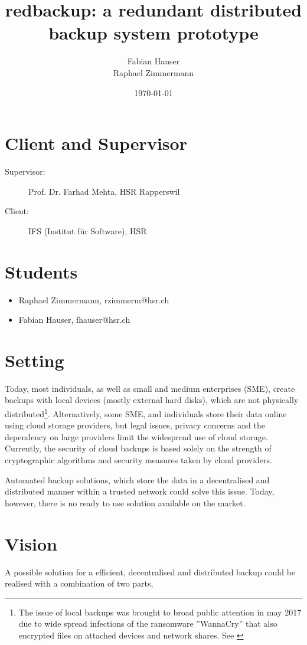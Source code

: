 \documentclass[a4paper]{article}
\title{redbackup: a redundant distributed backup system prototype}
\author{
		Fabian Hauser \\
		Raphael Zimmermann
}
\date{\today}
\begin{document}
\maketitle

\section{Client and Supervisor}
\begin{description}
	\item [Supervisor:] Prof. Dr. Farhad Mehta, HSR Rapperswil
	\item [Client:] IFS (Institut für Software), HSR
\end{description}


\section{Students}
\begin{itemize}
	\item Raphael Zimmermann, rzimmerm@hsr.ch
	\item Fabian Hauser, fhauser@hsr.ch
\end{itemize}

\section{Setting}

Today, most individuals, as well as small and medium enterprises (SME), create backups with local devices (mostly external hard disks), which are not physically distributed\footnote{The issue of local backups was brought to broad public attention in may 2017 due to wide spread infections of the ransomware ''WannaCry'' that also encrypted files on attached devices and network shares. See \cite{guardian_randsomware,nyt_randsomware}}. Alternatively, some SME, and individuals store their data online using cloud storage providers, but legal issues, privacy concerns and the dependency on large providers limit the widespread use of cloud storage. Currently, the security of cloud backups is based solely on the strength of cryptographic algorithms and security measures taken by cloud providers.

Automated backup solutions, which store the data in a decentralised and distributed manner within a trusted network could solve this issue. Today, however, there is no ready to use solution available on the market.


\section{Vision}
A possible solution for a efficient, decentralised and distributed backup could be realised with a combination of two parts,
\end{document}
